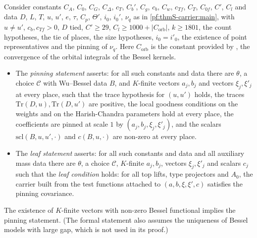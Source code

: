 \begin{definition}\label{pf:thmS-carrier:pinsleaves}
Consider constants $C_A$, $C_0$, $C_G$, $C_\Delta$, $c_T$, $C_b'$, $C_g$, $c_b$, $C_w$, $c_{Tf}$, $C_T$, $C_{0f}$, $C'$, $C_l$
and data $D$, $L$, $T$, $u$, $u'$, $e$, $\tau$, $C_p$, $\Theta'$, $i_0$, $i_0'$, $\nu_q$ as in \cref{pf:thmS-carrier:main}, with
$u\ne u'$, $c_b,c_{Tf}>0$, $D$ tied, $C'\ge29$, $C_l\ge1000+|C_{\mathrm{orb}}|$, $k\ge1801$, the count hypotheses, the tie of
places, the size hypotheses, $i_0=i'_0$, the existence of point representatives and the pinning of $\nu_q$. Here
$C_{\mathrm{orb}}$ is the constant provided by , the
convergence of the orbital integrals of the Bessel kernels.
\begin{itemize}
\item The \emph{pinning statement} asserts: for all such constants and data there are $\theta$, a choice $\mathcal C$ with
  Wu--Bessel data $B$, and $K$-finite vectors $a_j,b_j$ and vectors $\xi_j,\xi'_j$ at every place, such that the trace
  hypothesis for $(u,u')$ holds, the traces $\mathrm{Tr}(D,u),\mathrm{Tr}(D,u')$ are positive, the local goodness
  conditions on the weights and on the Harish-Chandra parameters hold at every place, the coefficients are pinned at scale
  $1$ by $(a_j,b_j,\xi_j,\xi'_j)$, and the scalars $\mathrm{scl}(B,u,u',\cdot)$ and $c(B,u,\cdot)$ are non-zero at every
  place.
\item The \emph{leaf statement} asserts: for all such constants and data and all auxiliary mass data there are $\theta$, a
  choice $\mathcal C$, $K$-finite $a_j,b_j$, vectors $\xi_j,\xi'_j$ and scalars $c_j$ such that the \emph{leaf condition}
  holds: for all top lifts, type projectors and $A_0$, the carrier built from the test functions attached to
  $(a,b,\xi,\xi',c)$ satisfies the pinning covariance.
\end{itemize}
\end{definition}

\begin{proposition}[Pins]\label{pf:thmS-carrier:xpins}
The existence of $K$-finite vectors with non-zero Bessel functional implies the pinning statement. (The formal statement also
assumes the uniqueness of Bessel models with large gap, which is not used in its proof.)
\end{proposition}

